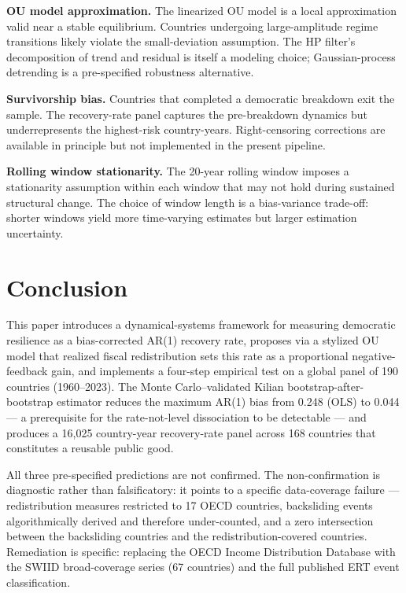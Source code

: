 \documentclass[11pt,letterpaper]{article}
\begin{document}
\textbf{OU model approximation.} The linearized OU model is a local approximation valid near a stable equilibrium.
Countries undergoing large-amplitude regime transitions likely violate the small-deviation assumption. The HP filter's
decomposition of trend and residual is itself a modeling choice; Gaussian-process detrending is a pre-specified
robustness alternative.

\textbf{Survivorship bias.} Countries that completed a democratic breakdown exit the sample. The recovery-rate panel
captures the pre-breakdown dynamics but underrepresents the highest-risk country-years. Right-censoring corrections are
available in principle but not implemented in the present pipeline.

\textbf{Rolling window stationarity.} The 20-year rolling window imposes a stationarity assumption within each window
that may not hold during sustained structural change. The choice of window length is a bias-variance trade-off: shorter
windows yield more time-varying estimates but larger estimation uncertainty.

\section{Conclusion}

This paper introduces a dynamical-systems framework for measuring democratic resilience as a bias-corrected AR(1)
recovery rate, proposes via a stylized OU model that realized fiscal redistribution sets this rate as a proportional
negative-feedback gain, and implements a four-step empirical test on a global panel of 190 countries (1960--2023). The
Monte Carlo--validated Kilian bootstrap-after-bootstrap estimator reduces the maximum AR(1) bias from 0.248 (OLS) to
0.044 --- a prerequisite for the rate-not-level dissociation to be detectable --- and produces a 16,025 country-year
recovery-rate panel across 168 countries that constitutes a reusable public good.

All three pre-specified predictions are not confirmed. The non-confirmation is diagnostic rather than falsificatory: it
points to a specific data-coverage failure --- redistribution measures restricted to 17 OECD countries, backsliding
events algorithmically derived and therefore under-counted, and a zero intersection between the backsliding countries
and the redistribution-covered countries. Remediation is specific: replacing the OECD Income Distribution Database with
the SWIID broad-coverage series (67 countries) and the full published ERT event classification.
\end{document}
